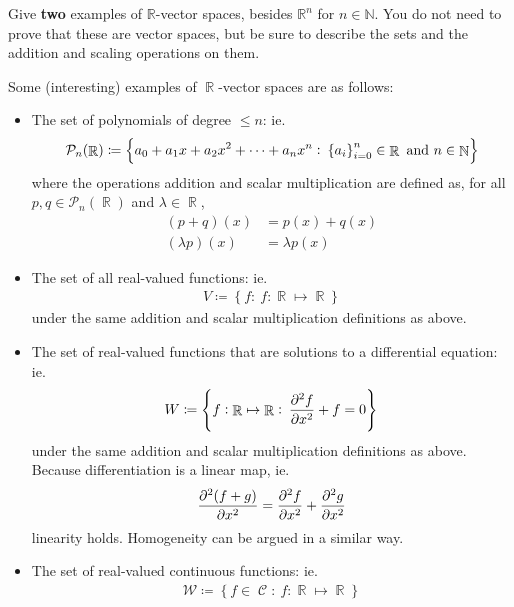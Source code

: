 \documentclass[answers,11pt]{exam}
\theoremstyle{definition}
\DeclareMathOperator{\N}{\mathbb{N}}
\DeclareMathOperator{\R}{\mathbb{R}}
\DeclareMathOperator{\1}{\mathbbm{1}}
\DeclareMathOperator{\contf}{\mathcal{C}}
\renewcommand{\leq}{\leqslant}
\newcommand{\condset}[4]{\left\{ #1  : \: #2 #3 #4 \right\}}
\newcommand{\polyn}[2]{\mathcal{P}_{#1}(#2)}
\begin{document}
\begin{questions}
\begin{parts}
\end{parts}
\addpoints

\question[20] Give \textbf{two} examples of $\mathbb{R}$-vector spaces, besides $\mathbb{R}^n$ for $n\in \mathbb{N}$. You do not need to prove that these are vector spaces, but be sure to describe the sets and the addition and scaling operations on them.
\addpoints

\begin{solution}
	Some (interesting) examples of $\R$-vector spaces are as follows:
	\begin{itemize}
		\item The set of polynomials of degree $\leq n$: ie.
		\begin{align*}
			\polyn{n}{\R} \coloneqq \condset{a_0 + a_1 x + a_2 x^2 + \dots + a_n x^n}{ \set{a_i}_{i=0}^{n} \in \R}{ \text{ and }}{n \in \N}
 		\end{align*}
 		where the operations addition and scalar multiplication are defined as, for all $p,q \in \polyn{n}{\R}$ and $\lambda \in \R$,
 		\begin{align*}
 		(p+q)(x) &= p(x) + q(x) \\
 		(\lambda p)(x) &= \lambda p(x)
 		\end{align*}
 		
 		\item The set of all real-valued functions: ie.
 		\begin{align*}
 			V \coloneqq \condset{f}{f}{:}{\R \mapsto \R}
 		\end{align*}
 		under the same addition and scalar multiplication definitions as above.
 		
 		
 		\item The set of real-valued functions that are solutions to a differential equation: ie.
 		\begin{align*}
 		W \coloneqq \condset{f: \R \mapsto \R}{\dpd[2]{f}{x}+f}{=}{0}
 		\end{align*}
 		under the same addition and scalar multiplication definitions as above. Because differentiation is a linear map, ie. 
 		\begin{align*}
 		 \dpd[2]{(f+g)}{x} = \dpd[2]{f}{x} + \dpd[2]{g}{x}
 		\end{align*}
 		linearity holds. Homogeneity can be argued in a similar way.
 		
 		\item The set of real-valued continuous functions: ie.
 		\begin{align*}
 		\mathcal{W} \coloneqq \condset{f \in \contf}{f}{:}{\R \mapsto \R}
 		\end{align*}
	\end{itemize}


\end{solution}
\end{questions}
\end{document}
